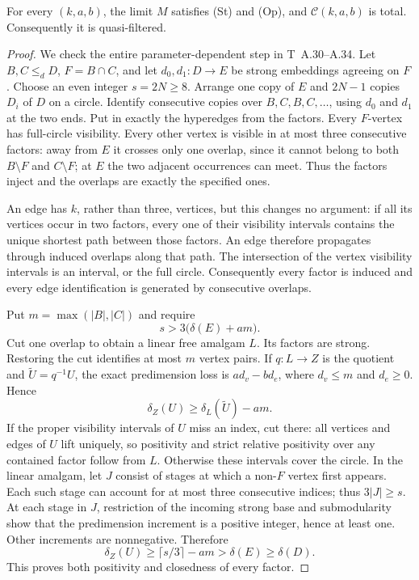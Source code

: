 \begin{theorem}
\label{D:total}
For every $(k,a,b)$, the limit $M$ satisfies (St) and (Op), and
$\mathcal C(k,a,b)$ is total. Consequently it is quasi-filtered.
\end{theorem}
\begin{proof}
We check the entire parameter-dependent step in T~A.30--A.34.
Let $B,C\leq_d D$, $F=B\cap C$, and let $d_0,d_1:D\to E$ be
strong embeddings agreeing on $F$. Choose an even integer $s=2N\geq8$.
Arrange one copy of $E$ and $2N-1$ copies $D_i$ of $D$ on a circle.
Identify consecutive copies over $B,C,B,C,\ldots$, using $d_0$ and
$d_1$ at the two ends. Put in exactly the hyperedges from the factors.
Every $F$-vertex has full-circle visibility. Every other vertex is
visible in at most three consecutive factors: away from $E$ it
crosses only one overlap, since it cannot belong to both
$B\setminus F$ and $C\setminus F$; at $E$ the two adjacent
occurrences can meet. Thus the factors inject and the overlaps are
exactly the specified ones.

An edge has $k$, rather than three, vertices, but this changes no
argument: if all its vertices occur in two factors, every one of their
visibility intervals contains the unique shortest path between those
factors. An edge therefore propagates through induced overlaps along
that path. The intersection of the vertex visibility intervals is an
interval, or the full circle. Consequently every factor is induced
and every edge identification is generated by consecutive overlaps.

Put $m=\max(|B|,|C|)$ and require
\[
                       s>3\bigl(\delta(E)+am\bigr).
\]
Cut one overlap to obtain a linear free amalgam $L$. Its factors are
strong. Restoring the cut identifies at most $m$ vertex pairs. If
$q:L\to Z$ is the quotient and $\widetilde U=q^{-1}U$, the exact
predimension loss is $a d_v-b d_e$, where $d_v\leq m$ and
$d_e\geq0$. Hence
\[
                      \delta_Z(U)\geq\delta_L(\widetilde U)-am.
\]
If the proper visibility intervals of $U$ miss an index, cut there:
all vertices and edges of $U$ lift uniquely, so positivity and strict
relative positivity over any contained factor follow from $L$.
Otherwise these intervals cover the circle. In the linear amalgam,
let $J$ consist of stages at which a non-$F$ vertex first appears.
Each such stage can account for at most three consecutive indices;
thus $3|J|\geq s$. At each stage in $J$, restriction of the incoming
strong base and submodularity show that the predimension increment
is a positive integer, hence at least one. Other increments are
nonnegative. Therefore
\[
 \delta_Z(U)\geq\lceil s/3\rceil-am>\delta(E)\geq\delta(D).
\]
This proves both positivity and closedness of every factor.


\end{proof}
